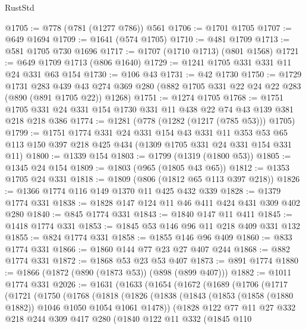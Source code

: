 \begin{lexlean}{RustStd}
\begin{coremodule}
@1705 := @778 (@781 (@1277 @786)) @561
@1706 := @1701 @1705
@1707 := @649 @1694
@1709 := @1641 (@574 @1705)
@1710 := @481 @1709
@1713 := @581 @1705 @730 @1696
@1717 := @1707 (@1710 @1713) (@801 @1568)
@1721 := @649 @1709 @1713 (@806 @1640)
@1729 := @1241 @1705 @331 @331 @11 @24 @331 @63 @154
@1730 := @106 @43
@1731 := @42 @1730
@1750 := @1729
    @1731
    @283
    @439
    @43
    @274
    @369
    @280
    (@882 @1705 @331 @22 @24 @22 @283 (@890 (@891 @1705 @22)) @1268)
@1751 := @1274 @1705
@1768 := @1751 @1705 @331 @24 @331 @154 @1730 @331 @11 @438 @22 @74 @43 @139 @381 @218 @218 @386
@1774 := @1281 (@778 (@1282 (@1217 (@785 @53))) @1705)
@1799 := @1751
    @1774
    @331
    @24
    @331
    @154
    @43
    @331
    @11
    @353
    @53
    @65
    @113
    @150
    @397
    @218
    @425
    @434
    (@1309 @1705 @331 @24 @331 @154 @331 @11)
@1800 := @1339 @154
@1803 := @1799 (@1319 (@1800 @53))
@1805 := @1345 @24 @154
@1809 := @1803 (@965 (@1805 @43 @65))
@1812 := @1353 @1705 @24 @331
@1818 := @1809 (@806 (@1812 @65 @113 @397 @218))
@1826 := @1366 @1774 @116 @149 @1370 @11 @425 @432 @339
@1828 := @1379 @1774 @331
@1838 := @1828 @147 @124 @11 @46 @411 @424 @431 @309 @402 @280
@1840 := @845 @1774 @331
@1843 := @1840 @147 @11 @411
@1845 := @1418 @1774 @331
@1853 := @1845 @53 @146 @96 @11 @218 @409 @331 @132
@1855 := @824 @1774 @331
@1858 := @1855 @146 @96 @409
@1860 := @833 @1774 @331
@1866 := @1860 @144 @77 @23 @27 @407 @244
@1868 := @882 @1774 @331
@1872 := @1868 @53 @23 @53 @407
@1873 := @891 @1774
@1880 := @1866 (@1872 (@890 (@1873 @53)) (@898 (@899 @407)))
@1882 := @1011 @1774 @331
@2026 := @1631
    (@1633
      (@1654
        (@1672
          (@1689
            (@1706
              (@1717
                (@1721
                  (@1750
                    (@1768
                      (@1818
                        (@1826
                          (@1838
                            (@1843 (@1853 (@1858 (@1880 @1882)) @1046 @1050 @1054 @1061 @1478))
                            (@1828
                              @122
                              @77
                              @11
                              @27
                              @332
                              @218
                              @244
                              @309
                              @417
                              @280
                              (@1840
                                @122
                                @11
                                @332
                                (@1845
                                  @110

\end{coremodule}
\end{lexlean}
